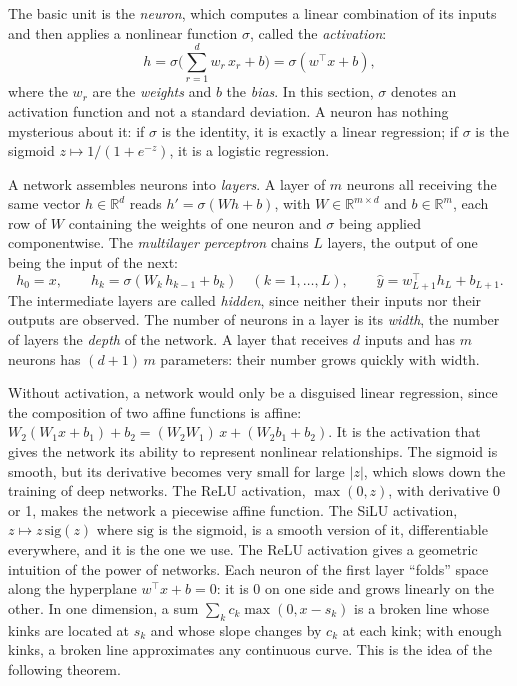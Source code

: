 \documentclass[11pt,a4paper]{article}
\begin{document}
The basic unit is the \emph{neuron}, which computes a linear combination of its inputs and then applies a nonlinear
function $\sigma$, called the \emph{activation}:
\[
h = \sigma\Big(\sum_{r=1}^{d} w_r\,x_r + b\Big) = \sigma(w^\top x + b),
\]
where the $w_r$ are the \emph{weights} and $b$ the \emph{bias}. In this section, $\sigma$ denotes an activation
function and not a standard deviation. A neuron has nothing mysterious about it: if $\sigma$ is the identity, it is
exactly a linear regression; if $\sigma$ is the sigmoid $z \mapsto 1/(1 + e^{-z})$, it is a logistic regression.

A network assembles neurons into \emph{layers}. A layer of $m$ neurons all receiving the same vector
$h \in \mathbb{R}^{d}$ reads $h' = \sigma(W h + b)$, with $W \in \mathbb{R}^{m \times d}$ and $b \in \mathbb{R}^{m}$,
each row of $W$ containing the weights of one neuron and $\sigma$ being applied componentwise. The \emph{multilayer
perceptron} chains $L$ layers, the output of one being the input of the next:
\begin{equation}\label{eq:mlp}
h_0 = x, \qquad h_k = \sigma(W_k\, h_{k-1} + b_k) \quad (k = 1, \dots, L), \qquad \hat y = w_{L+1}^\top h_L + b_{L+1} .
\end{equation}
The intermediate layers are called \emph{hidden}, since neither their inputs nor their outputs are observed. The
number of neurons in a layer is its \emph{width}, the number of layers the \emph{depth} of the network. A layer that
receives $d$ inputs and has $m$ neurons has $(d + 1)\,m$ parameters: their number grows quickly with width.

Without activation, a network would only be a disguised linear regression, since the composition of two affine
functions is affine: $W_2(W_1 x + b_1) + b_2 = (W_2 W_1)\,x + (W_2 b_1 + b_2)$. It is the activation that gives the
network its ability to represent nonlinear relationships. The sigmoid is smooth, but its derivative becomes very small
for large $\lvert z \rvert$, which slows down the training of deep networks. The ReLU activation, $\max(0, z)$, with
derivative 0 or 1, makes the network a piecewise affine function. The SiLU activation,
$z \mapsto z\,\mathrm{sig}(z)$ where $\mathrm{sig}$ is the sigmoid, is a smooth version of it, differentiable
everywhere, and it is the one we use. The ReLU activation gives a geometric intuition of the power of networks. Each
neuron of the first layer ``folds'' space along the hyperplane $w^\top x + b = 0$: it is 0 on one side and grows
linearly on the other. In one dimension, a sum $\sum_k c_k \max(0, x - s_k)$ is a broken line whose kinks are located at
$s_k$ and whose slope changes by $c_k$ at each kink; with enough kinks, a broken line approximates any continuous
curve. This is the idea of the following theorem.
\end{document}

